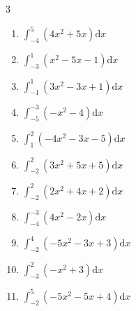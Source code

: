 \begin{multicols}{3}
\begin{enumerate}
  \item $\displaystyle \int_{-4}^{5}\left( 4x^{2}+5x \right) \mathrm{d}x$


  \item $\displaystyle \int_{-3}^{1}\left( x^{2}-5x-1 \right) \mathrm{d}x$


  \item $\displaystyle \int_{-1}^{1}\left( 3x^{2}-3x+1 \right) \mathrm{d}x$


  \item $\displaystyle \int_{-5}^{-3}\left( -x^{2}-4 \right) \mathrm{d}x$

        \phantom{$\displaystyle =-34$}

  \item $\displaystyle \int_{1}^{2}\left( -4x^{2}-3x-5 \right) \mathrm{d}x$


\columnbreak %

  \item $\displaystyle \int_{-2}^{2}\left( 3x^{2}+5x+5 \right) \mathrm{d}x$


  \item $\displaystyle \int_{-2}^{2}\left( 2x^{2}+4x+2 \right) \mathrm{d}x$

        \phantom{$\displaystyle =12$}

  \item $\displaystyle \int_{-4}^{-3}\left( 4x^{2}-2x \right) \mathrm{d}x$


  \item $\displaystyle \int_{-2}^{4}\left( -5x^{2}-3x+3 \right) \mathrm{d}x$

        \phantom{$\displaystyle =-135$}

  \item $\displaystyle \int_{-3}^{2}\left( -x^{2}+3 \right) \mathrm{d}x$


\columnbreak %

\resetques

  \item $\displaystyle \int_{-2}^{5}\left( -5x^{2}-5x+4 \right) \mathrm{d}x$


\end{enumerate}
\end{multicols}
